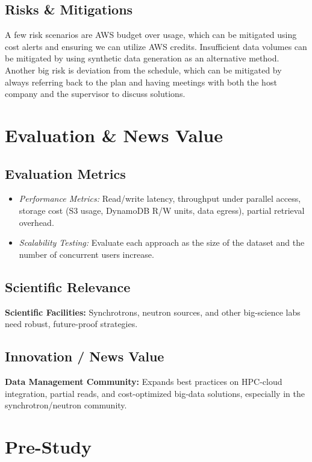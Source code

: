 \documentclass{article}
\begin{document}
\subsection{Risks \& Mitigations}
A few risk scenarios are AWS budget over usage, which can be mitigated using cost alerts and ensuring we can utilize AWS credits. Insufficient data volumes can be mitigated by using synthetic data generation as an alternative method. Another big risk is deviation from the schedule, which can be mitigated by always referring back to the plan and having meetings with both the host company and the supervisor to discuss solutions. 



\section{Evaluation \& News Value}

\subsection{Evaluation Metrics}
\begin{itemize}
    \item \emph{Performance Metrics:} Read/write latency, throughput under parallel access, storage cost (S3 usage, DynamoDB R/W units, data egress), partial retrieval overhead.
    \item \emph{Scalability Testing:} Evaluate each approach as the size of the dataset and the number of concurrent users increase.
\end{itemize}


\subsection{Scientific Relevance}
\textbf{Scientific Facilities:} Synchrotrons, neutron sources, and other big-science labs need robust, future-proof strategies.


\subsection{Innovation / News Value}
\textbf{Data Management Community:} Expands best practices on HPC-cloud integration, partial reads, and cost-optimized big-data solutions, especially in the synchrotron/neutron community.






\section{Pre-Study}
\end{document}
